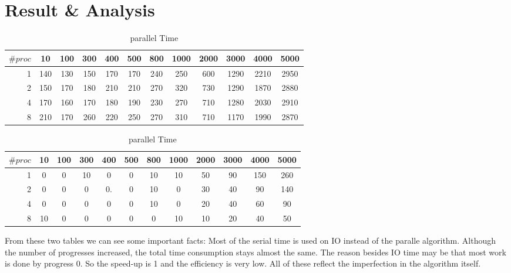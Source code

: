 \documentclass{article}
\begin{document}
\section{Result \& Analysis}
\begin{center}
 \begin{table}
 \begin{tabular}[t]{r|ccccccccccc}
$\# proc$&10&100&300&400&500&800&1000&2000&3000&4000&5000\\
\hline
1&140&130&150&170&170&240&250&600&1290&2210&2950\\
2&150&170&180&210&210&270&320&730&1290&1870&2880\\
4&170&160&170&180&190&230&270&710&1280&2030&2910\\
8&210&170&260&220&250&270&310&710&1170&1990&2870\\
\end{tabular}
\caption{Serial Time}
\begin{tabular}[t]{r|ccccccccccc}
$\# proc$&10&100&300&400&500&800&1000&2000&3000&4000&5000\\
\hline
1&0&0&10&0&0&10&10&50&90&150&260\\
2&0&0&0&0.&0&10&0&30&40&90&140\\
4&0&0&0&0&0&10&0&20&40&60&90\\
8&10&0&0&0&0&0&10&10&20&40&50\\
\end{tabular}
\caption{parallel Time}
\end{table}
\end{center}
From these two tables we can see some important facts: Most of the serial time is used on IO instead of the paralle algorithm. Although the number of progresses increased, the total time consumption stays almost the same. The reason besides IO time may be that most work is done by progress 0. So the speed-up is 1 and the efficiency is very low. All of these reflect the imperfection in the algorithm itself.
\end{document}

